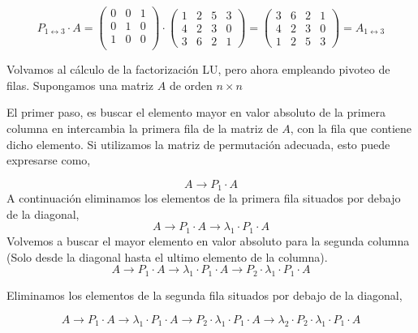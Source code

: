 \begin{equation*}
P_{1\leftrightarrow 3}\cdot A=\begin{pmatrix}
0& 0& 1\\
0& 1& 0\\
1& 0& 0\\
\end{pmatrix} \cdot \begin{pmatrix}
1& 2& 5& 3\\
4& 2& 3& 0\\
3& 6& 2& 1
\end{pmatrix} = \begin{pmatrix}
3& 6& 2& 1\\
4& 2& 3& 0\\
1& 2& 5& 3
\end{pmatrix}= A_{1\leftrightarrow 3}
\end{equation*}

Volvamos al cálculo de la factorización LU, pero ahora empleando pivoteo de filas. Supongamos una matriz $A$ de orden $n\times n$

El primer paso, es buscar el elemento mayor en valor absoluto de la primera columna en intercambia la primera fila de la matriz de $A$, con la fila que contiene dicho elemento. Si utilizamos la matriz de permutación adecuada, esto puede expresarse como,

\begin{equation*}
A \rightarrow P_1\cdot A
\end{equation*}
A continuación eliminamos los elementos de la primera fila situados por debajo de la diagonal,
\begin{equation*}
A \rightarrow P_1\cdot A \rightarrow \lambda_1 \cdot P_1 \cdot A
\end{equation*}
Volvemos a buscar el mayor elemento en valor absoluto para la segunda columna (Solo desde la diagonal hasta el ultimo elemento de la columna).  
\begin{equation*}
A \rightarrow P_1\cdot A \rightarrow \lambda_1 \cdot P_1 \cdot A \rightarrow  P_2 \cdot \lambda_1 \cdot P_1 \cdot A 
\end{equation*}

Eliminamos los elementos de la segunda fila situados por debajo de la diagonal,

\begin{equation*}
A \rightarrow P_1\cdot A \rightarrow \lambda_1 \cdot P_1 \cdot A \rightarrow  P_2 \cdot \lambda_1 \cdot P_1 \cdot A \rightarrow \lambda_2 \cdot  P_2 \cdot \lambda_1 \cdot P_1 \cdot A
\end{equation*}

